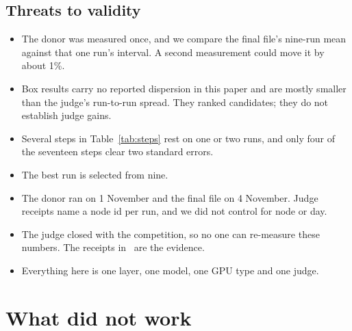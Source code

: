 \documentclass[11pt]{article}
\begin{document}
\subsection{Threats to validity}

\begin{itemize}
  \item The donor was measured once, and we compare the final file's nine-run mean
  against that one run's interval. A second measurement could move it by about
  1\%.
  \item Box results carry no reported dispersion in this paper and are mostly
  smaller than the judge's run-to-run spread. They ranked candidates; they do not
  establish judge gains.
  \item Several steps in Table~\ref{tab:steps} rest on one or two runs, and only
  four of the seventeen steps clear two standard errors.
  \item The best run is selected from nine.
  \item The donor ran on 1 November and the final file on 4 November. Judge
  receipts name a node id per run, and we did not control for node or day.
  \item The judge closed with the competition, so no one can re-measure these
  numbers. The receipts in~\cite{repo} are the evidence.
  \item Everything here is one layer, one model, one GPU type and one judge.
\end{itemize}

\section{What did not work}
\label{sec:negative}
\end{document}
